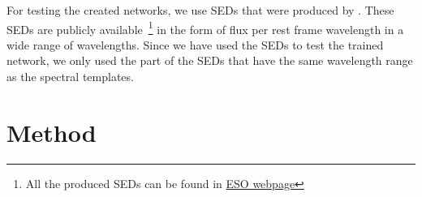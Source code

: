     For testing the created networks, we use SEDs that were produced by . 
    These SEDs are publicly available~\footnote{All the  produced SEDs can be found in \href{http://telbib.eso.org/detail.php?bibcode=2012AJ....144..172T}{ESO webpage}} in the form of flux per rest frame wavelength in a wide range of wavelengths.
    Since we have used the  SEDs to test the trained network, we only used the part of the SEDs that have the same wavelength range as the  spectral templates.  

\section{Method}
\label{sec: method_somz}
